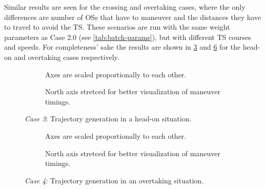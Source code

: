 Similar results are seen for the crossing and overtaking cases, where the only differences are number of OSs that have to maneuver and the distances they have to travel to avoid the TS. These scenarios are run with the same weight parameters as Case 2.0 (see \cref{tab:batch-params}), but with different TS courses and speeds. For completeness' sake the results are shown in \cref{fig:head-on} and \cref{fig:overtaking} for the head-on and overtaking cases respectively. 






\begin{figure}[htbp]
    \centering
    \begin{subfigure}[b]{\textwidth}
        \centering
        
        \caption{Axes are scaled proportionally to each other.}
        \label{fig:head-on-scenario-a}
    \end{subfigure}
    \begin{subfigure}[b]{\textwidth}
        \centering
        
        \caption{North axis stretced for better visualization of maneuver timings.}
        \label{fig:head-on-scenario-b}
    \end{subfigure}
    \caption{\emph{Case 3}: Trajectory generation in a head-on situation.}
    \label{fig:head-on}
\end{figure}




\begin{figure}[htbp]
    \centering
    \begin{subfigure}[b]{\textwidth}
        
        \caption{Axes are scaled proportionally to each other.}
        \label{fig:overtaking-scenario-a}
    \end{subfigure}
    \begin{subfigure}[b]{\textwidth}
        
        \caption{North axis stretced for better visualization of maneuver timings.}
        \label{fig:overtaking-scenario-b}
    \end{subfigure}
    \caption{\emph{Case 4}: Trajectory generation in an overtaking situation.}
    \label{fig:overtaking}
\end{figure}